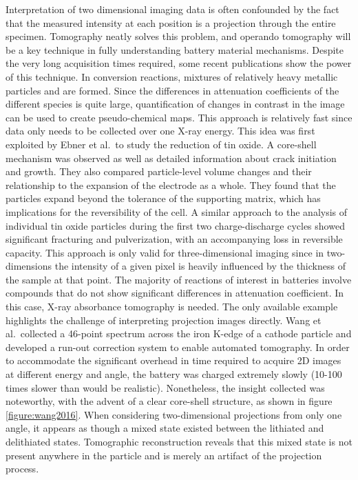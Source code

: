 \documentclass[journal=cmatex,manuscript=perspective]{achemso}
\begin{document}
Interpretation of two dimensional imaging data is often confounded by
the fact that the measured intensity at each position is a projection
through the entire specimen. Tomography neatly solves this problem,
and operando tomography will be a key technique in fully understanding
battery material mechanisms. Despite the very long acquisition times
required, some recent publications show the power of this
technique. In conversion reactions, mixtures of relatively heavy
metallic particles and  are formed\cite{cabana2010-2}. Since
the differences in attenuation coefficients of the different species
is quite large, quantification of changes in contrast in the image can
be used to create pseudo-chemical maps. This approach is relatively
fast since data only needs to be collected over one X-ray energy. This
idea was first exploited by Ebner et al.\ to study the reduction of
tin oxide. A core-shell mechanism was observed as well as detailed
information about crack initiation and growth. They also compared
particle-level volume changes and their relationship to the expansion
of the electrode as a whole. They found that the particles expand
beyond the tolerance of the supporting matrix, which has implications
for the reversibility of the cell\cite{ebner2013}. A similar approach
to the analysis of individual tin oxide particles during the first two
charge-discharge cycles showed significant fracturing and
pulverization, with an accompanying loss in reversible
capacity\cite{wang2014-2}. This approach is only valid for
three-dimensional imaging since in two-dimensions the intensity of a
given pixel is heavily influenced by the thickness of the sample at
that point. The majority of reactions of interest in batteries involve
compounds that do not show significant differences in attenuation
coefficient. In this case, X-ray absorbance tomography is needed. The
only available example highlights the challenge of interpreting
projection images directly. Wang et al.\ collected a 46-point spectrum
across the iron K-edge of a  cathode particle and
developed a run-out correction system to enable automated
tomography. In order to accommodate the significant overhead in time
required to acquire 2D images at different energy and angle, the
battery was charged extremely slowly (10-100 times slower than would
be realistic). Nonetheless, the insight collected was noteworthy, with
the advent of a clear core-shell structure, as shown in figure
\ref{figure:wang2016}. When considering two-dimensional projections
from only one angle, it appears as though a mixed state existed
between the lithiated and delithiated states. Tomographic
reconstruction reveals that this mixed state is not present anywhere
in the particle and is merely an artifact of the projection
process\cite{wang2016}.
\end{document}
